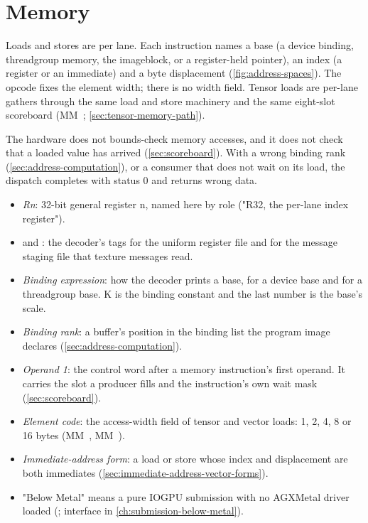 \chapter{Memory}\label{ch:memory}

Loads and stores are per lane. Each instruction names a
base (a device binding, threadgroup memory, the imageblock, or a register-held pointer), an index (a register or an
immediate) and a byte displacement (\cref{fig:address-spaces}). The opcode fixes the element width; there is no width field.
Tensor loads are per-lane gathers through the same load and store machinery and the same eight-slot scoreboard (MM~;
\cref{sec:tensor-memory-path}).

The hardware does not bounds-check memory accesses, and it does not check that a loaded value has arrived
(\cref{sec:scoreboard}). With a wrong binding rank (\cref{sec:address-computation}), or a consumer that does not wait
on its load, the dispatch completes with status 0 and returns wrong data.


\begin{itemize}
\item \emph{Rn}: 32-bit general register n, named here by role ("R32, the per-lane index register").
\item \emph{} and \emph{}: the decoder's tags for the uniform register file and for the message staging file that texture
  messages read.
\item \emph{Binding expression}: how the decoder prints a base,  for a device base and
   for a threadgroup base. K is the binding constant and the last number is the base's scale.
\item \emph{Binding rank}: a buffer's position in the binding list the program image declares (\cref{sec:address-computation}).
\item \emph{Operand 1}: the control word after a memory instruction's first operand. It carries the slot a producer fills
  and the instruction's own wait mask (\cref{sec:scoreboard}).
\item \emph{Element code}: the access-width field of tensor and vector loads: 1, 2, 4, 8 or 16 bytes (MM~, MM~).
\item \emph{Immediate-address form}: a load or store whose index and displacement are both immediates (\cref{sec:immediate-address-vector-forms}).
\item "Below Metal" means a pure IOGPU submission with no AGXMetal driver loaded
  (; interface in \cref{ch:submission-below-metal}).
\end{itemize}


